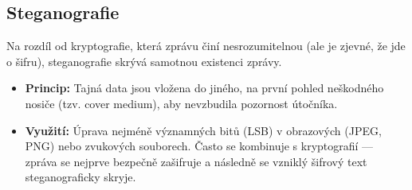\subsection{Steganografie}
Na rozdíl od kryptografie, která zprávu činí nesrozumitelnou (ale je zjevné, že jde o šifru), steganografie skrývá samotnou existenci zprávy.
\begin{itemize}
    \item \textbf{Princip:} Tajná data jsou vložena do jiného, na první pohled neškodného nosiče (tzv. cover medium), aby nevzbudila pozornost útočníka.
    \item \textbf{Využití:} Úprava nejméně významných bitů (LSB) v obrazových (JPEG, PNG) nebo zvukových souborech. Často se kombinuje s kryptografií — zpráva se nejprve bezpečně zašifruje a následně se vzniklý šifrový text steganograficky skryje.
\end{itemize}

